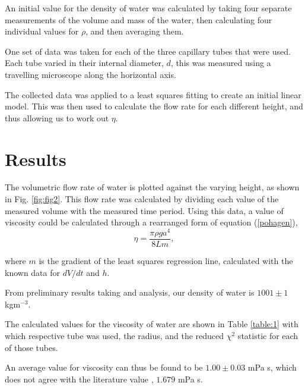 \documentclass[twocolumn]{revtex4}
\newcommand{\squeezeup}{\vspace{-2.5mm}}
\begin{document}
\squeezeup
\squeezeup

An initial value for the density of water was calculated by taking four separate measurements of the volume and mass of the water, then calculating four individual values for $\rho$, and then averaging them.

One set of data was taken for each of the three capillary tubes that were used. Each tube varied in their internal diameter, $d$, this was measured using a travelling microscope along the horizontal axis. 

The collected data was applied to a least squares fitting to create an initial linear model. This was then used to calculate the flow rate for each different height, and thus allowing us to work out $\eta$.

\vspace{-3ex}
\section{Results}
\vspace{-2ex}

The volumetric flow rate of water is plotted against the varying height, as shown in Fig. \ref{fig:fig2}. This flow rate was calculated by dividing each value of the measured volume with the measured time period. Using this data, a value of viscosity could be calculated through a rearranged form of equation (\ref{pohagen}),
\squeezeup
\begin{equation} 
\eta=\frac{\pi \rho g a^4 }{8 L m}, 
\label{r-pohagen}
\end{equation}

where $m$ is the gradient of the least squares regression line, calculated with the known data for $dV/dt$ and $h$.

From preliminary results taking and analysis, our density of water is ${1001 \pm 1}$ kgm$^{-3}$.

The calculated values for the viscosity of water are shown in Table \ref{table:1} with which respective tube was used, the radius, and the reduced $\chi^2$ statistic for each of those tubes. 

An average value for viscosity can thus be found to be $1.00 \pm 0.03$ mPa s, which does not agree with the literature value \cite{crc}, $1.679$  mPa {s}. 
\end{document}
